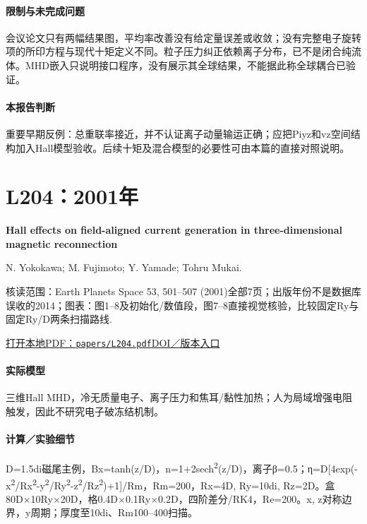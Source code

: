 \paragraph{限制与未完成问题}会议论文只有两幅结果图，平均率改善没有给定量误差或收敛；没有完整电子旋转项的所印方程与现代十矩定义不同。粒子压力纠正依赖离子分布，已不是闭合纯流体。MHD嵌入只说明接口程序，没有展示其全球结果，不能据此称全球耦合已验证。

\paragraph{本报告判断}重要早期反例：总重联率接近，并不认证离子动量输运正确；应把Piyz和vz空间结构加入Hall模型验收。后续十矩及混合模型的必要性可由本篇的直接对照说明。

\section{L204：2001年}\label{paper:L204}

\textbf{Hall effects on field-aligned current generation in three-dimensional magnetic reconnection}\citep{L204}\

N. Yokokawa;  M. Fujimoto;  Y. Yamade;  Tohru Mukai.

\textsf{核读范围：}Earth Planets Space 53, 501–507 (2001)全部7页；出版年份不是数据库误收的2014；\textsf{图表：}图1–8及初始化/数值段，图7–8直接视觉核验，比较固定Ry与固定Ry/D两条扫描路线.

\href{run:papers/L204.pdf}{打开本地PDF：\texttt{papers/L204.pdf}}\quad\href{https://doi.org/10.1186/bf03353262}{DOI／版本入口}

\paragraph{实际模型}三维Hall MHD，冷无质量电子、离子压力和焦耳/黏性加热；人为局域增强电阻触发，因此不研究电子破冻结机制。

\paragraph{计算／实验细节}D=1.5di磁尾主例，Bx=tanh(z/D)，n=1+2sech\textsuperscript{2}(z/D)，离子β=0.5；η=D[4exp(-x\textsuperscript{2}/Rx\textsuperscript{2}-y\textsuperscript{2}/Ry\textsuperscript{2}-z\textsuperscript{2}/Rz\textsuperscript{2})+1]/Rm，Rm=200，Rx=4D, Ry=10di, Rz=2D。盒80D×10Ry×20D，格0.4D×0.1Ry×0.2D，四阶差分/RK4，Re=200。x, z对称边界，y周期；厚度至10di、Rm100–400扫描。

